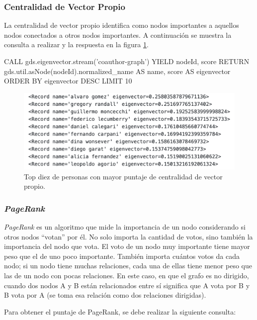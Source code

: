 \documentclass[journal]{IEEEtran}
\begin{document}
\subsubsection{Centralidad de Vector Propio}
La centralidad de vector propio identifica como nodos importantes a aquellos nodos conectados a otros nodos importantes. A continuación se muestra la consulta a realizar y la respuesta en la figura \ref{fig:vector_propio}.
\begin{sflisting}[style=sparql,caption= Centralidad de Vector Propio,label=eigenvector]
	CALL gds.eigenvector.stream('coauthor-graph')
	YIELD nodeId, score
	RETURN gds.util.asNode(nodeId).normalized_name
	AS name, score AS eigenvector
	ORDER BY eigenvector DESC
	LIMIT 10
\end{sflisting}

\begin{figure}[htb]
	\centering
	\includegraphics[width=\linewidth]{imagenes/eigenvector.png}
	\caption{Top diez de personas con mayor puntaje de centralidad de vector propio.}
	\label{fig:vector_propio}
\end{figure}

\subsubsection{\textit{PageRank}}
\textit{PageRank} es un algoritmo que mide la importancia de un nodo considerando si otros nodos ``votan'' por él. No solo importa la cantidad de votos, sino también la importancia del nodo que vota. El voto de un nodo muy importante tiene mayor peso que el de uno poco importante. También importa cuántos votos da cada nodo; si un nodo tiene muchas relaciones, cada una de ellas tiene menor peso que las de un nodo con pocas relaciones. En este caso, en que el grafo es no dirigido, cuando dos nodos A y B están relacionados entre sí significa que A vota por B y B vota por A (se toma esa relación como dos relaciones dirigidas).

Para obtener el puntaje de PageRank, se debe realizar la siguiente consulta:
\end{document}
